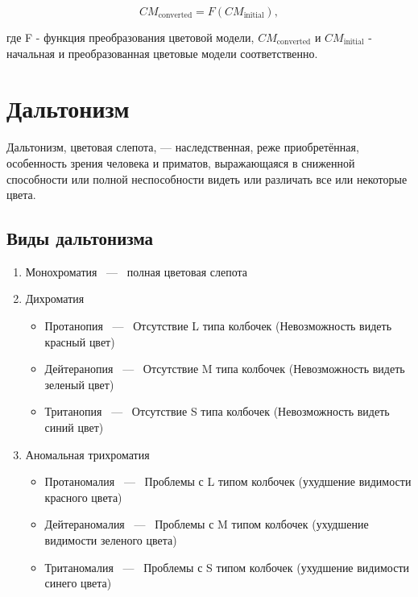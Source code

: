 \documentclass[a4paper,14pt, unknownkeysallowed]{extreport}
\begin{document}
    \begin{equation}
        CM_{\text{converted}} = F(CM_{\text{initial}}),
    \end{equation}
    \label{math:base_formula}

    \noindent
    где F - функция преобразования цветовой модели, $CM_{\text{converted}}$ и $CM_{\text{initial}}$ - начальная и преобразованная цветовые модели соответственно.

    \section{Дальтонизм}
    Дальтонизм, цветовая слепота, — наследственная, реже приобретённая, особенность зрения человека и приматов, выражающаяся в сниженной способности или полной неспособности видеть или различать все или некоторые цвета.
    
    \subsection{Виды дальтонизма}
    \begin{enumerate}
        \item Монохроматия ~---~ полная цветовая слепота
        \item Дихроматия
        \begin{itemize}
            \item Протанопия ~---~ Отсутствие L типа колбочек (Невозможность видеть красный цвет)
            \item Дейтеранопия ~---~ Отсутствие M типа колбочек (Невозможность видеть зеленый цвет)
            \item Тританопия ~---~ Отсутствие S типа колбочек (Невозможность видеть синий цвет)
        \end{itemize}
        \item Аномальная трихроматия
        \begin{itemize}
            \item Протаномалия ~---~ Проблемы с L типом колбочек (ухудшение видимости красного цвета)
            \item Дейтераномалия ~---~ Проблемы с M типом колбочек (ухудшение видимости зеленого цвета)
            \item Тританомалия ~---~ Проблемы с S типом колбочек (ухудшение видимости синего цвета)
        \end{itemize}
    \end{enumerate}
\end{document}
